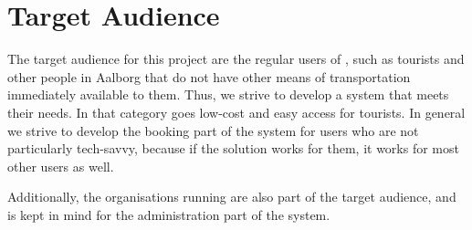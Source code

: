 \section{Target Audience}\label{sec:ta}
The target audience for this project are the regular users of \bycykelwithoutspace, such as tourists and other people in Aalborg that do not have other means of transportation immediately available to them. 
Thus, we strive to develop a system that meets their needs.
In that category goes low-cost and easy access for tourists.
In general we strive to develop the booking part of the system for users who are not particularly tech-savvy, because if the solution works for them, it works for most other users as well.

Additionally, the organisations running \bycykel are also part of the target audience, and is kept in mind for the administration part of the system.